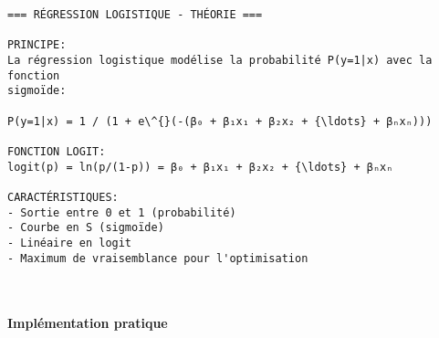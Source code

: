 \documentclass[11pt]{article}
\begin{document}
    \begin{Verbatim}[commandchars=\\\{\}]
=== RÉGRESSION LOGISTIQUE - THÉORIE ===

PRINCIPE:
La régression logistique modélise la probabilité P(y=1|x) avec la fonction
sigmoïde:

P(y=1|x) = 1 / (1 + e\^{}(-(β₀ + β₁x₁ + β₂x₂ + {\ldots} + βₙxₙ)))

FONCTION LOGIT:
logit(p) = ln(p/(1-p)) = β₀ + β₁x₁ + β₂x₂ + {\ldots} + βₙxₙ

CARACTÉRISTIQUES:
- Sortie entre 0 et 1 (probabilité)
- Courbe en S (sigmoïde)
- Linéaire en logit
- Maximum de vraisemblance pour l'optimisation

    \end{Verbatim}

    \begin{center}
    \end{center}
    { \hspace*{\fill} \\}
    
    \paragraph{Implémentation pratique}\label{impluxe9mentation-pratique}
\end{document}
